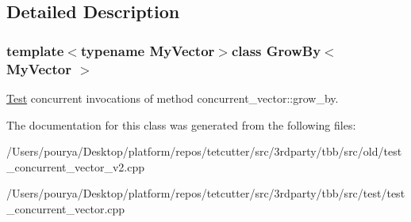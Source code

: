 \subsection{Detailed Description}
\subsubsection*{template$<$typename My\+Vector$>$class Grow\+By$<$ My\+Vector $>$}

\hyperlink{classTest}{Test} concurrent invocations of method concurrent\+\_\+vector\+::grow\+\_\+by. 

The documentation for this class was generated from the following files\+:\begin{DoxyCompactItemize}
\item 
/\+Users/pourya/\+Desktop/platform/repos/tetcutter/src/3rdparty/tbb/src/old/test\+\_\+concurrent\+\_\+vector\+\_\+v2.\+cpp\item 
/\+Users/pourya/\+Desktop/platform/repos/tetcutter/src/3rdparty/tbb/src/test/test\+\_\+concurrent\+\_\+vector.\+cpp\end{DoxyCompactItemize}
